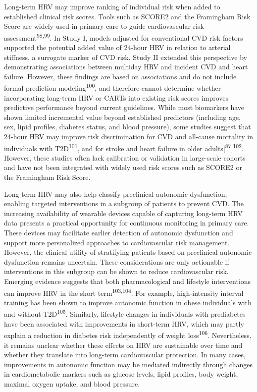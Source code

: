 \documentclass[
  a4paper,
  headsepline=true,
  open=any]{scrbook}
\begin{document}
Long-term HRV may improve ranking of individual risk when added to
established clinical risk scores. Tools such as SCORE2 and the
Framingham Risk Score are widely used in primary care to guide
cardiovascular risk assessment\textsuperscript{98,99}. In Study I,
models adjusted for conventional CVD risk factors supported the
potential added value of 24-hour HRV in relation to arterial stiffness,
a surrogate marker of CVD risk. Study II extended this perspective by
demonstrating associations between multiday HRV and incident CVD and
heart failure. However, these findings are based on associations and do
not include formal prediction modeling\textsuperscript{100}, and
therefore cannot determine whether incorporating long-term HRV or CARTs
into existing risk scores improves predictive performance beyond current
guidelines. While most biomarkers have shown limited incremental value
beyond established predictors (including age, sex, lipid profiles,
diabetes status, and blood pressure), some studies suggest that 24-hour
HRV may improve risk discrimination for CVD and all-cause mortality in
individuals with T2D\textsuperscript{101}, and for stroke and heart
failure in older adults{[}\textsuperscript{87}{]}\textsuperscript{102}.
However, these studies often lack calibration or validation in
large-scale cohorts and have not been integrated with widely used risk
scores such as SCORE2 or the Framingham Risk Score.

Long-term HRV may also help classify preclinical autonomic dysfunction,
enabling targeted interventions in a subgroup of patients to prevent
CVD. The increasing availability of wearable devices capable of
capturing long-term HRV data presents a practical opportunity for
continuous monitoring in primary care. These devices may facilitate
earlier detection of autonomic dysfunction and support more personalized
approaches to cardiovascular risk management. However, the clinical
utility of stratifying patients based on preclinical autonomic
dysfunction remains uncertain. These considerations are only actionable
if interventions in this subgroup can be shown to reduce cardiovascular
risk. Emerging evidence suggests that both pharmacological and lifestyle
interventions can improve HRV in the short
term\textsuperscript{103,104}. For example, high-intensity interval
training has been shown to improve autonomic function in obese
individuals with and without T2D\textsuperscript{105}. Similarly,
lifestyle changes in individuals with prediabetes have been associated
with improvements in short-term HRV, which may partly explain a
reduction in diabetes risk independently of weight
loss\textsuperscript{106}. Nevertheless, it remains unclear whether
these effects on HRV are sustainable over time and whether they
translate into long-term cardiovascular protection. In many cases,
improvements in autonomic function may be mediated indirectly through
changes in cardiometabolic markers such as glucose levels, lipid
profiles, body weight, maximal oxygen uptake, and blood pressure.
\end{document}
